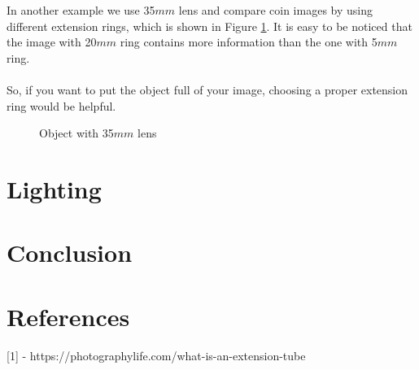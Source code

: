 \documentclass[english]{article}
\begin{document}
In another example we use 35$mm$ lens and compare coin images by using different extension rings, which is shown in Figure \ref{fig:three}.
It is easy to be noticed that the image with 20$mm$ ring contains more information than the one with 5$mm$ ring.\\
\\
So, if you want to put the object full of your image, choosing a proper extension ring would be helpful.
\begin{figure}[H]
	\centering
	\caption{Object with 35$mm$ lens}
	\label{fig:three}
\end{figure}

\section{Lighting}


\section{Conclusion}


\section{References}
{[}1{]} - https://photographylife.com/what-is-an-extension-tube
\end{document}

